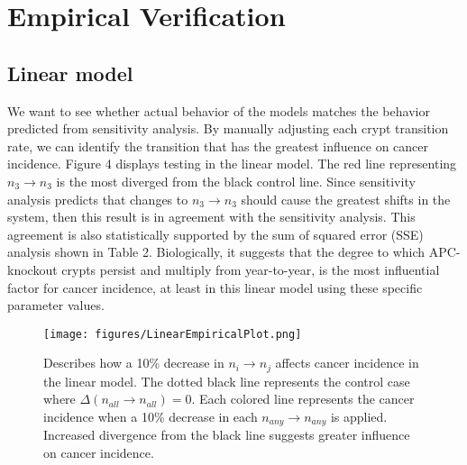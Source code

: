 \section{Empirical Verification}

\subsection{Linear model}

We want to see whether actual behavior of the models matches the behavior predicted from sensitivity analysis. By manually adjusting each crypt transition rate, we can identify the transition that has the greatest influence on cancer incidence. Figure 4 displays testing in the linear model. The red line representing $n_3 \rightarrow n_3$ is the most diverged from the black control line. Since sensitivity analysis predicts that changes to $n_3 \rightarrow n_3$ should cause the greatest shifts in the system, then this result is in agreement with the sensitivity analysis. This agreement is also statistically supported by the sum of squared error (SSE) analysis shown in Table 2. Biologically, it suggests that the degree to which APC-knockout crypts persist and multiply from year-to-year, is the most influential factor for cancer incidence, at least in this linear model using these specific parameter values.

\begin{figure}[h]
    \centering
    \texttt{[image: figures/LinearEmpiricalPlot.png]}
    \caption{Describes how a 10\% decrease in $n_i \rightarrow n_j$ affects cancer incidence in the linear model. The dotted black line represents the control case where $\Delta (n_{all} \rightarrow n_{all}) = 0$. Each colored line represents the cancer incidence when a 10\% decrease in each $n_{any} \rightarrow n_{any}$ is applied. Increased divergence from the black line suggests greater influence on cancer incidence. }
    \label{fig:linear sys empirical}
\end{figure}


